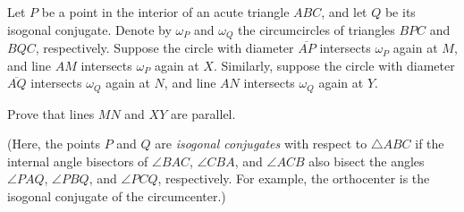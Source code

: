 Let $P$ be a point in the interior of an acute triangle $ABC$, and let $Q$ be its isogonal conjugate.  Denote by $\omega_P$ and $\omega_Q$ the circumcircles of triangles $BPC$ and $BQC$, respectively.  Suppose the circle with diameter $\overline{AP}$ intersects $\omega_P$ again at $M$, and line $AM$ intersects $\omega_P$ again at $X$.  Similarly, suppose the circle with diameter $\overline{AQ}$ intersects $\omega_Q$ again at $N$, and line $AN$ intersects $\omega_Q$ again at $Y$.

Prove that lines $MN$ and $XY$ are parallel.

(Here, the points $P$ and $Q$ are \textit{isogonal conjugates} with respect to $\triangle ABC$ if the internal angle bisectors of $\angle BAC$, $\angle CBA$, and $\angle ACB$ also bisect the angles $\angle PAQ$, $\angle PBQ$, and $\angle PCQ$, respectively.  For example, the orthocenter is the isogonal conjugate of the circumcenter.)

